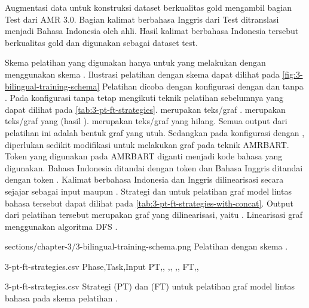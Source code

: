 Augmentasi data untuk konstruksi dataset berkualitas gold mengambil bagian Test  dari AMR 3.0.
Bagian kalimat berbahasa Inggris dari Test  ditranslasi menjadi Bahasa Indonesia oleh ahli.
Hasil kalimat berbahasa Indonesia tersebut berkualitas gold dan digunakan sebagai dataset test.

\newcommand\graphMasked{\codesm{\textcolor[rgb]{0,.33,0}{<g>$g_1$,..[mask]..,$g_m$</g>}}}
\newcommand\graphBarMasked{\codesm{\textcolor[rgb]{0,.33,0}{<g>[mask]</g>}}}
\newcommand\idTagged[1]{\codesm{\textcolor{purple}{<id>#1</id>}}}
\newcommand\enTagged[1]{\codesm{\textcolor{blue}{<en>#1</en>}}}
\newcommand\sTagged[1]{\codesm{\textcolor{purple}{<s>#1</s>}}}

Skema pelatihan yang digunakan hanya untuk yang melakukan \amrparsing{} dengan menggunakan skema .
Ilustrasi pelatihan dengan skema  dapat dilihat pada \cref{fig:3-bilingual-training-schema}
Pelatihan dicoba dengan konfigurasi dengan dan tanpa .
Pada konfigurasi tanpa  tetap mengikuti teknik pelatihan sebelumnya yang dapat dilihat pada \cref{tab:3-pt-ft-strategies}.
 merupakan teks/graf .
 merupakan teks/graf yang  (hasil \denoising{}).
 merupakan teks/graf yang hilang.
Semua output dari pelatihan ini adalah bentuk graf yang utuh.
Sedangkan pada konfigurasi dengan , diperlukan sedikit modifikasi untuk melakukan \pretraining{} graf pada teknik \gls{AMRBART}.
Token  yang digunakan pada \gls{AMRBART} diganti menjadi kode bahasa yang digunakan.
Bahasa Indonesia ditandai dengan token  dan Bahasa Inggris ditandai dengan token .
Kalimat berbahasa Indonesia dan Inggris dilinearisasi secara sejajar sebagai input \pretraining{} maupun \finetuning{}.
Strategi \pretraining{} dan \finetuning{} untuk pelatihan graf model \amrparsing{} lintas bahasa tersebut dapat dilihat pada \cref{tab:3-pt-ft-strategies-with-concat}.
Output dari pelatihan tersebut merupakan graf \AMR{} yang dilinearisasi, yaitu .
Linearisasi graf menggunakan algoritma \gls{DFS} .

  {sections/chapter-3/3-bilingual-training-schema.png}
  {Pelatihan dengan skema .}

\begin{filecontents*}{3-pt-ft-strategies.csv}
Phase,Task,Input
PT,,\makecell[cl]{\sTagged{[mask]}\graphMasked{}}
,,\makecell[cl]{\sTagged{$a_1$,..,$a_n$}\graphMasked{}}
,,\makecell[cl]{\sTagged{$a_1$,..[mask]..,$a_n$}\graphMasked{}}
FT,,\makecell[cl]{\sTagged{$a_1$,..,$a_n$}\graphMasked{}}
\end{filecontents*}
  {3-pt-ft-strategies.csv}
  {Strategi \pretraining{} (PT) dan \finetuning{} (FT) untuk pelatihan graf model \amrparsing{} lintas bahasa pada skema pelatihan .}

